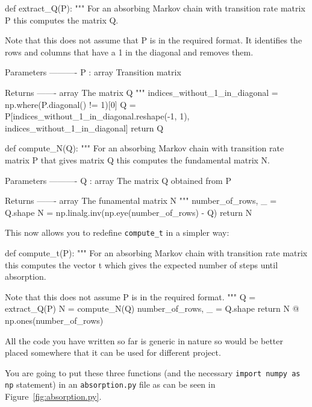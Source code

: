 \begin{python}
def extract_Q(P):
    """
    For an absorbing Markov chain with transition rate matrix P this computes the
    matrix Q.

    Note that this does not assume that P is in the required format. It
    identifies the rows and columns that have a 1 in the diagonal and removes
    them.

    Parameters
    ----------
    P : array
        Transition matrix

    Returns
    -------
    array
        The matrix Q
    """
    indices_without_1_in_diagonal = np.where(P.diagonal() != 1)[0]
    Q = P[indices_without_1_in_diagonal.reshape(-1, 1), indices_without_1_in_diagonal]
    return Q


def compute_N(Q):
    """
    For an absorbing Markov chain with transition rate matrix P that gives
    matrix Q this computes the fundamental matrix N.

    Parameters
    ----------
    Q : array
        The matrix Q obtained from P

    Returns
    -------
    array
        The funamental matrix N
    """
    number_of_rows, _ = Q.shape
    N = np.linalg.inv(np.eye(number_of_rows) - Q)
    return N
\end{python}





This now allows you to redefine \texttt{compute\_t} in a simpler way:




\begin{python}
def compute_t(P):
    """
    For an absorbing Markov chain with transition rate matrix this computes the
    vector t which gives the expected number of steps until absorption.

    Note that this does not assume P is in the required format.
    """
    Q = extract_Q(P)
    N = compute_N(Q)
    number_of_rows, _ = Q.shape
    return N @ np.ones(number_of_rows)
\end{python}


\begin{note}
All the code you have written so far is generic in nature so would be better
placed somewhere that it can be used for different project.
\end{note}



You are going to put these three functions (and the necessary \texttt{import
numpy as np} statement) in an \texttt{absorption.py} file as can be seen in
Figure~\ref{fig:absorption.py}.

